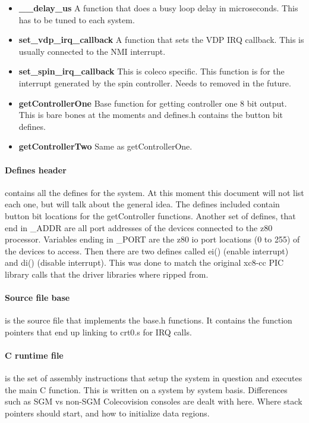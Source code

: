 \documentclass{article}
\begin{document}
  \begin{itemize}
    \item \textbf{\_\_delay\_us} A function that does a busy loop delay in microseconds. This has to be tuned to each system.
    \item \textbf{set\_vdp\_irq\_callback} A function that sets the VDP IRQ callback. This is usually connected to the NMI interrupt.
    \item \textbf{set\_spin\_irq\_callback} This is coleco specific. This function is for the interrupt generated by the spin controller. Needs to removed in the future.
    \item \textbf{getControllerOne} Base function for getting controller one 8 bit output. This is bare bones at the moments and defines.h contains the button bit defines.
    \item \textbf{getControllerTwo} Same as getControllerOne.
  \end{itemize}

  \paragraph{Defines header} contains all the defines for the system. At this moment this document will not list each one, but will talk about the general idea.
  The defines included contain button bit locations for the getController functions. Another set of defines, that end in  \_ADDR are all port addresses of the
  devices connected to the z80 processor. Variables ending in \_PORT are the z80 io port locations (0 to 255) of the devices to access. Then there are two defines
  called ei() (enable interrupt) and di() (disable interrupt). This was done to match the original xc8-cc PIC library calls that the driver libraries where ripped from.

  \paragraph{Source file base} is the source file that implements the base.h functions. It contains the function pointers that end up linking to crt0.s for IRQ calls.

  \paragraph{C runtime file} is the set of assembly instructions that setup the system in question and executes the main C function. This is written on a system by system basis.
  Differences such as SGM vs non-SGM Colecovision consoles are dealt with here. Where stack pointers should start, and how to initialize data regions.
\end{document}
